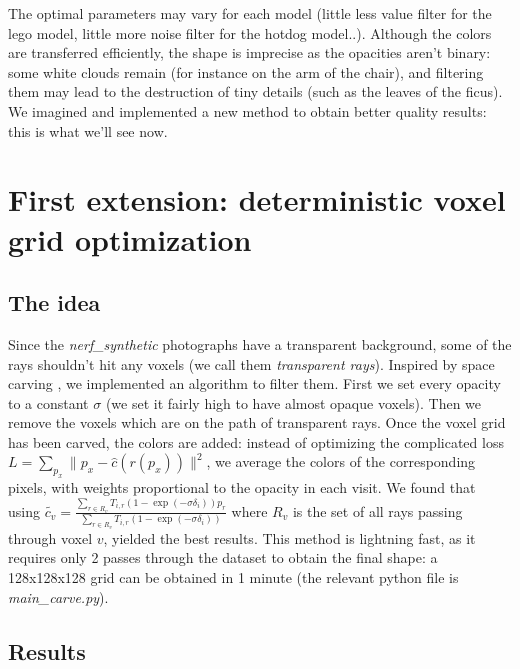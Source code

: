 \documentclass{article}
\begin{document}
The optimal parameters may vary for each model (little less value filter for the lego model, little more noise filter for the hotdog model..). Although the colors are transferred efficiently, the shape is imprecise as the opacities aren't binary: some white clouds remain (for instance on the arm of the chair), and filtering them may lead to the destruction of tiny details (such as the leaves of the ficus). We imagined and implemented a new method to obtain better quality results: this is what we'll see now.

\section{First extension: deterministic voxel grid optimization}\label{sec:extent}

\subsection{The idea}

Since the \textit{nerf\_synthetic} photographs have a transparent background, some of the rays shouldn't hit any voxels (we call them \textit{transparent rays}). Inspired by space carving \cite{spacecarving}, we implemented an algorithm to filter them. First we set every opacity to a constant $\sigma$ (we set it fairly high to have almost opaque voxels). Then we remove the voxels which are on the path of transparent rays. Once the voxel grid has been carved, the colors are added: instead of optimizing the complicated loss $L = \sum_{p_x} \|p_x -\hat{c}(r(p_x)) \|^2$, we average the colors of the corresponding pixels, with weights proportional to the opacity in each visit. We found that using $\tilde{c_v} = \frac{ \sum_{r \in R_v} T_{i,r}  (1 - \exp(-\sigma \delta_i)) p_r }{ \sum_{r \in R_v} T_{i,r}  (1 - \exp(-\sigma \delta_i))  }$ where $R_v$ is the set of all rays passing through voxel $v$, yielded the best results. This method is lightning fast, as it requires only 2 passes through the dataset to obtain the final shape: a 128x128x128 grid can be obtained in 1 minute (the relevant python file is \textit{main\_carve.py}).

\subsection{Results}
\end{document}
